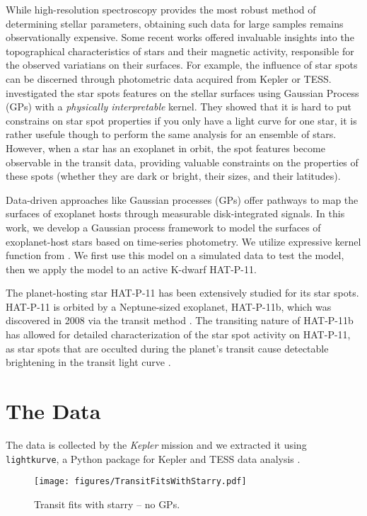 \documentclass[twocolumn]{aastex631}
\begin{document}
While high-resolution spectroscopy provides the most robust method of determining stellar parameters, obtaining such data for large samples remains 
observationally expensive. Some recent works offered invaluable insights into the topographical characteristics of stars and their magnetic 
activity, responsible for the observed variatians on their surfaces. For example, the influence of star spots can be discerned through photometric 
data acquired from Kepler or TESS. \cite{Luger2021b} investigated the star spots features on the stellar surfaces using Gaussian Process (GPs) 
with a \emph{physically interpretable} kernel. They showed that it is hard to put constrains on star spot properties if you only have a light curve for 
one star, it is rather usefule though to perform the same analysis for an ensemble of stars. However, when a star has an exoplanet in orbit, 
the spot features become observable in the transit data, providing valuable constraints on the properties of these spots 
(whether they are dark or bright, their sizes, and their latitudes).

Data-driven approaches like Gaussian processes (GPs) offer pathways to map the surfaces of exoplanet hosts through measurable disk-integrated signals. 
In this work, we develop a Gaussian process framework to model the surfaces of exoplanet-host stars based on time-series photometry. We utilize 
expressive kernel function from \cite{Luger2021b}. We first use this model on a simulated data to test the model, then we apply the model to an active K-dwarf
HAT-P-11. 

The planet-hosting star HAT-P-11 has been extensively studied for its star spots. HAT-P-11 is orbited by a Neptune-sized exoplanet, HAT-P-11b, 
which was discovered in 2008 via the transit method \citep{Bakos2010,Deming2011}. The transiting nature of HAT-P-11b has allowed for detailed 
characterization of the star spot activity on HAT-P-11, as star spots that are occulted during the planet's transit cause detectable brightening in 
the transit light curve \citep{Morris2017}. 


%
\section{The Data}
The data is collected by the \emph{Kepler} mission and we extracted it using
\texttt{lightkurve}, a Python package for Kepler and TESS data analysis \citep{lightkurve}.
%
\begin{figure}[ht!]
    \begin{centering}
        \texttt{[image: figures/TransitFitsWithStarry.pdf]}
        \caption{
            Transit fits with starry -- no GPs.
        }
        \label{fig:TransitFitsStarry}
    \end{centering}
\end{figure}
%
\end{document}
